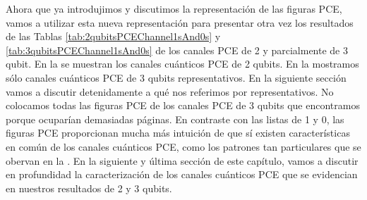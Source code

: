 
Ahora que ya introdujimos y discutimos la representación de las figuras PCE,
vamos a utilizar esta nueva representación para presentar otra vez 
los resultados de las Tablas \ref{tab:2qubitsPCEChannel1sAnd0s} 
y \ref{tab:3qubitsPCEChannel1sAnd0s} de los canales PCE de 2 y 
parcialmente de 3 qubit.
En la  se muestran los canales cuánticos PCE de 2 qubits. 
En la  
mostramos sólo canales cuánticos PCE de 3 qubits representativos. En la siguiente 
sección vamos a discutir detenidamente a qué nos referimos por representativos.
No colocamos todas las figuras PCE de los canales PCE de 3 qubits que 
encontramos porque ocuparían demasiadas páginas.
En contraste con las listas de 1 y 0, las figuras PCE proporcionan mucha 
más intuición de que sí existen características en común de los canales 
cuánticos PCE, como los patrones tan particulares que se obervan en la
. En la siguiente y última sección 
de este capítulo, vamos a discutir en profundidad la caracterización de los 
canales cuánticos PCE que se evidencian en nuestros resultados de 2 y 3 qubits.


\newpage

